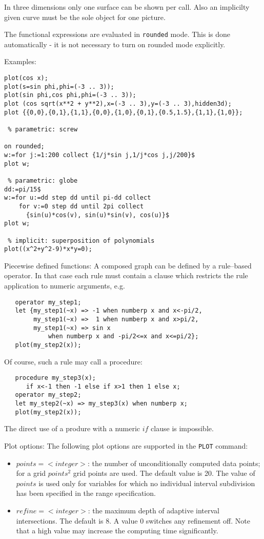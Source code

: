 In three dimensions only one surface can be shown per call.
Also an implicilty given curve  must be the sole object for one
picture.

The functional expressions are evaluated in \verb$rounded$ mode.
This is done automatically - it is not necessary to turn
on rounded mode explicitly. 

\newpage

Examples:
\begin{verbatim}
plot(cos x);
plot(s=sin phi,phi=(-3 .. 3));
plot(sin phi,cos phi,phi=(-3 .. 3));
plot (cos sqrt(x**2 + y**2),x=(-3 .. 3),y=(-3 .. 3),hidden3d);
plot {{0,0},{0,1},{1,1},{0,0},{1,0},{0,1},{0.5,1.5},{1,1},{1,0}};

 % parametric: screw

on rounded;
w:=for j:=1:200 collect {1/j*sin j,1/j*cos j,j/200}$
plot w;

 % parametric: globe
dd:=pi/15$
w:=for u:=dd step dd until pi-dd collect
    for v:=0 step dd until 2pi collect
      {sin(u)*cos(v), sin(u)*sin(v), cos(u)}$
plot w;

 % implicit: superposition of polynomials
plot((x^2+y^2-9)*x*y=0);
\end{verbatim}
 
Piecewise defined functions: 
A composed graph can be defined by a rule--based operator.
In that case each rule must contain a clause which restricts
the rule application to numeric arguments, e.g.
\begin{verbatim}
   operator my_step1;
   let {my_step1(~x) => -1 when numberp x and x<-pi/2, 
        my_step1(~x) =>  1 when numberp x and x>pi/2,
        my_step1(~x) => sin x
            when numberp x and -pi/2<=x and x<=pi/2};
   plot(my_step2(x));
\end{verbatim}
Of course, such a rule may call a procedure:
\begin{verbatim}
   procedure my_step3(x);
      if x<-1 then -1 else if x>1 then 1 else x;
   operator my_step2;
   let my_step2(~x) => my_step3(x) when numberp x; 
   plot(my_step2(x));
\end{verbatim}
The direct use of a produre with a numeric $if$ clause
is impossible. 

Plot options:
The following plot options are supported in the \verb+PLOT+ command:

\begin{itemize}
   \item $points=<integer>$: the number of unconditionally computed
       data points; for a grid $points^2$ grid points are used.
     The default value is 20. The value of $points$ is used
     only for variables for which no individual interval
     subdivision has been specified in the range specification.
   \item $refine=<integer>$: the maximum depth of adaptive 
       interval intersections. The default is 8. A value 0 switches
       any refinement off. Note that a high value may increase the
       computing time significantly.
\end{itemize}


